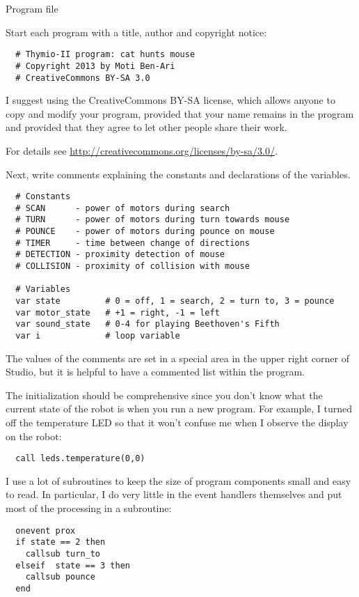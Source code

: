 
{\raggedleft \hfill Program file }

Start each program with a title, author and copyright notice:
\begin{verbatim}
  # Thymio-II program: cat hunts mouse
  # Copyright 2013 by Moti Ben-Ari
  # CreativeCommons BY-SA 3.0
\end{verbatim}

I suggest using the CreativeCommons BY-SA license, which allows anyone
to copy and modify your program, provided that your name remains in the
program and provided that they agree to let other people share their
work.

For details see \url{http://creativecommons.org/licenses/by-sa/3.0/}.

Next, write comments explaining the constants and declarations of the
variables.
\begin{verbatim}
  # Constants
  # SCAN      - power of motors during search
  # TURN      - power of motors during turn towards mouse
  # POUNCE    - power of motors during pounce on mouse
  # TIMER     - time between change of directions
  # DETECTION - proximity detection of mouse
  # COLLISION - proximity of collision with mouse

  # Variables
  var state         # 0 = off, 1 = search, 2 = turn to, 3 = pounce
  var motor_state   # +1 = right, -1 = left
  var sound_state   # 0-4 for playing Beethoven's Fifth
  var i             # loop variable
\end{verbatim}
The values of the comments are set in a special area in the upper right
corner of Studio, but it is helpful to have a commented list within the
program.

The initialization should be comprehensive since you don't know what the
current state of the robot is when you run a new program. For example, I
turned off the temperature LED so that it won't confuse me when I
observe the display on the robot:

\begin{verbatim}
  call leds.temperature(0,0)
\end{verbatim}

I use a lot of subroutines to keep the size of program components small
and easy to read. In particular, I do very little in the event handlers
themselves and put most of the processing in a subroutine:
\begin{verbatim}
  onevent prox
  if state == 2 then
    callsub turn_to
  elseif  state == 3 then
    callsub pounce
  end
\end{verbatim}

